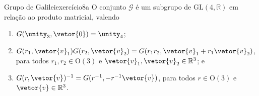 \begin{proposition}{Grupo de Galilei}{exercício8a}
    O conjunto \(\mathscr{G}\) é um subgrupo de \(\mathrm{GL}(4,\mathbb{\mathbb{R}})\) em relação ao produto matricial, valendo
    \begin{enumerate}[label=(\roman*)]
        \item \(G(\unity_3, \vetor{0}) = \unity_4\);
        \item \(G(r_1, \vetor{v}_1) G(r_2, \vetor{v}_2) = G(r_1r_2, \vetor{v}_1 + r_1\vetor{v}_2)\), para todos \(r_1,r_2 \in \mathrm{O}(3)\) e \(\vetor{v}_1, \vetor{v}_2 \in \mathbb{R}^3\); e
        \item \(G(r, \vetor{v})^{-1} = G(r^{-1}, -r^{-1}\vetor{v})\), para todos \(r \in \mathrm{O}(3)\) e \(\vetor{v} \in \mathbb{R}^3\).
    \end{enumerate}
\end{proposition}
